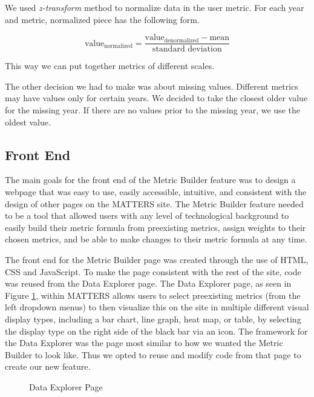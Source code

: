 				We used \emph{z-transform} method to normalize data in the user metric. For each year and metric, normalized piece has the following form.
				
				\[
					\text{value}_\text{normalized} = \frac{\text{value}_\text{denormalized} - \text{mean}}{\text{standard deviation}}
				\]
				
				This way we can put together metrics of different scales.
				
				The other decision we had to make was about missing values. Different metrics may have values only for certain years. We decided to take the closest older value for the missing year. If there are no values prior to the missing year, we use the oldest value. 

		\subsection{Front End}
		
			The main goals for the front end of the Metric Builder feature was to design a webpage 
			that was easy to use, easily accessible, intuitive, and consistent 
			with the design of other pages on the MATTERS site. 
			The Metric Builder feature needed to be a tool that allowed users with any level of 
			technological background to easily build their metric formula from preexisting metrics, 
			assign weights to their chosen metrics, and be able to make changes to their metric formula at any time.
			
			The front end for the Metric Builder page was created through the use of HTML, CSS and JavaScript. 
			To make the page consistent with the rest of the site, code was reused from the Data Explorer page. 
			The Data Explorer page, as seen in Figure \ref{fig:dataexplorer}, within MATTERS allows users to select 
			preexisting metrics (from the left dropdown menus) to then visualize this on the site in multiple different visual display types, 
			including a bar chart, line graph, heat map, or table, by selecting the display type on the right side of the black bar via an icon. The framework for the 
			Data Explorer was the page most similar to how we wanted the Metric Builder to look like. Thus we opted to 
			reuse and modify code from that page to create our new feature. 
			
			\begin{figure}[t]
				\centering
					\caption{Data Explorer Page}
				\label{fig:dataexplorer}
			\end{figure}
			
